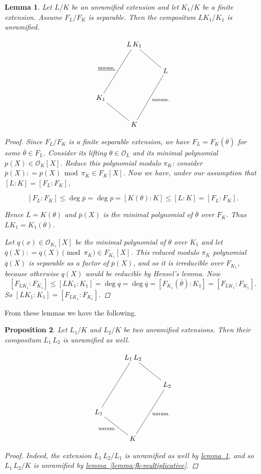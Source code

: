 \documentclass{article}
\newcommand{\dfn}{\mathrel{\mathop:}=}
\renewcommand{\O}{\mathcal{O}}
\renewcommand{\mod}{\mathop{\,\mathrm{mod}\,}}
\newcommand{\refref}[2]{\hyperref[#2]{#1~\ref*{#2}}}
\theoremstyle{myplain}
\newtheorem{proposition}{Proposition}[section]
\newtheorem{lemma}[proposition]{Lemma}
\theoremstyle{mydefinition}
\begin{document}
\begin{lemma}\label{lemma:compositum-unramified}
  Let $L/K$ be an unramified extension and let $K_1/K$ be a finite
  extension. Assume $F_L/F_K$ is separable. Then the compositum $LK_1 / K_1$ is
  unramified.

  \[ \xymatrix{
      & L \, K_1\ar@{-}[ddl]_{\underline{\mathrm{unram.}}}\ar@{-}[dr] \\
      & & L\ar@{-}[ddl]^{\mathrm{unram.}} \\
      K_1\ar@{-}[dr] & & \\
      & K
    } \]

  \begin{proof}
    Since $F_L / F_K$ is a finite separable extension, we have
    $F_L = F_K (\overline{\theta})$ for some $\overline{\theta} \in
    F_L$. Consider its lifting $\theta \in \O_L$ and its minimal polynomial
    $p (X) \in \O_K [X]$. Reduce this polynomial modulo $\pi_K$: consider
    $\overline{p} (X) \dfn p (X) \mod \pi_K \in F_K [X]$. Now we have, under our
    assumption that $[L:K] = [F_L:F_K]$,

    \[ [F_L : F_K] \le \deg \overline{p} = \deg {p} =
      [K (\theta) : K] \le [L : K] = [F_L : F_K]. \]

    Hence $L = K (\theta)$ and $\overline{p} (X)$ is the minimal polynomial of
    $\overline{\theta}$ over $F_K$. Thus $L K_1 = K_1 (\theta)$.

    Let $q (x) \in \O_{K_1} [X]$ be the minimal polynomial of $\theta$ over
    $K_1$ and let $\overline{q} (X) \dfn q (X) \pmod \pi_K \in F_{K_1}
    [X]$. This reduced modulo $\pi_K$ polynomial $\overline{q} (X)$ is separable
    as a factor of $\overline{p} (X)$, and so it is irreducible over $F_{K_1}$,
    because otherwise $q (X)$ would be reducible by Hensel's lemma. Now
    \[ [F_{L K_1} : F_{K_1}] \le [L K_1 : K_1] = \deg q =
      \deg \overline{q} = [F_{K_1} (\overline{\theta}) : K_1] =
      [F_{L K_1} : F_{K_1}]. \]
    So $[L K_1 : K_1] = [F_{L K_1} : F_{K_1}]$.
  \end{proof}
\end{lemma}

\vspace{1em}

From these lemmas we have the following.

\begin{proposition}
  Let $L_1/K$ and $L_2/K$ be two unramified extensions. Then their compositum
  $L_1\,L_2$ is unramified as well.

  \[ \xymatrix{
      & L_1 \, L_2\ar@{-}[ddl]\ar@{-}[dr] \\
      & & L_2\ar@{-}[ddl]^{\mathrm{unram.}} \\
      L_1\ar@{-}[dr]_{\mathrm{unram.}} & & \\
      & K
    } \]

  \begin{proof}
    Indeed, the extension $L_1\,L_2 / L_1$ is unramified as well by
    \refref{lemma}{lemma:compositum-unramified}, and so $L_1\,L_2 / K$ is
    unramified by \refref{lemma}{lemma:fk-multiplicative}.
  \end{proof}
\end{proposition}
\end{document}

